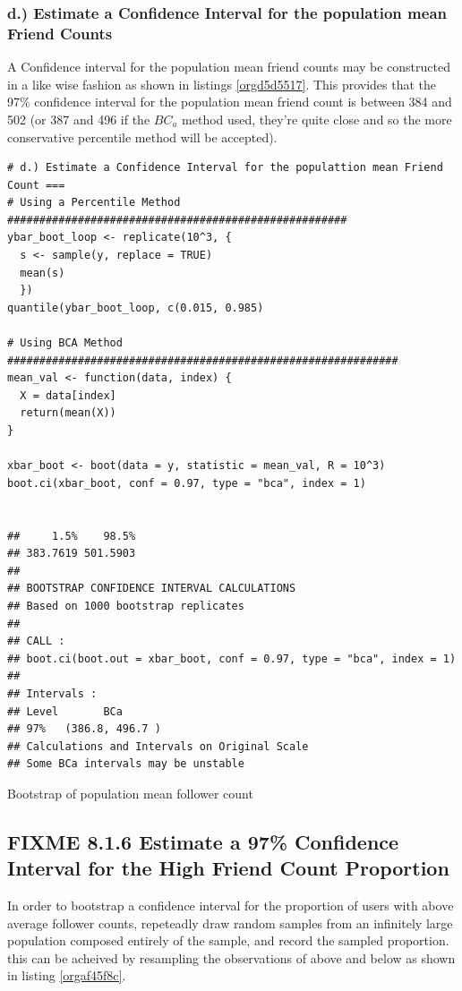 \documentclass[11pt]{article}
\begin{document}
\subsubsection{d.) Estimate a Confidence Interval for the population mean Friend Counts}
\label{sec:orge94aa23}
A Confidence interval for the population mean friend counts may be constructed in a like wise fashion as shown in listings \ref{orgd5d5517}. This provides that the 97\% confidence interval for the population mean friend count is between 384 and 502 (or 387 and 496 if the \(BC_{a}\) method used, they're quite close and so the more conservative percentile method will be accepted).

\begin{listing}[htbp]
\begin{verbatim}
# d.) Estimate a Confidence Interval for the populattion mean Friend Count ===
# Using a Percentile Method #####################################################
ybar_boot_loop <- replicate(10^3, {
  s <- sample(y, replace = TRUE)
  mean(s)
  })
quantile(ybar_boot_loop, c(0.015, 0.985)

# Using BCA Method #############################################################
mean_val <- function(data, index) {
  X = data[index]
  return(mean(X))
}

xbar_boot <- boot(data = y, statistic = mean_val, R = 10^3)
boot.ci(xbar_boot, conf = 0.97, type = "bca", index = 1)


##     1.5%    98.5%
## 383.7619 501.5903
##
## BOOTSTRAP CONFIDENCE INTERVAL CALCULATIONS
## Based on 1000 bootstrap replicates
##
## CALL :
## boot.ci(boot.out = xbar_boot, conf = 0.97, type = "bca", index = 1)
##
## Intervals :
## Level       BCa
## 97%   (386.8, 496.7 )
## Calculations and Intervals on Original Scale
## Some BCa intervals may be unstable
\end{verbatim}
\caption{\label{orgd5d5517}Bootstrap of population mean follower count}
\end{listing}

\subsection{{\bfseries\sffamily FIXME} 8.1.6 Estimate a 97\% Confidence Interval for the High Friend Count Proportion}
\label{sec:orga8365ce}
In order to bootstrap a confidence interval for the proportion of users with
above average follower counts, repeteadly draw random samples from an infinitely
large population composed entirely of the sample, and record the sampled
proportion. this can be acheived by resampling the observations of above and
below as shown in listing \ref{orgaf45f8c}.
\end{document}
